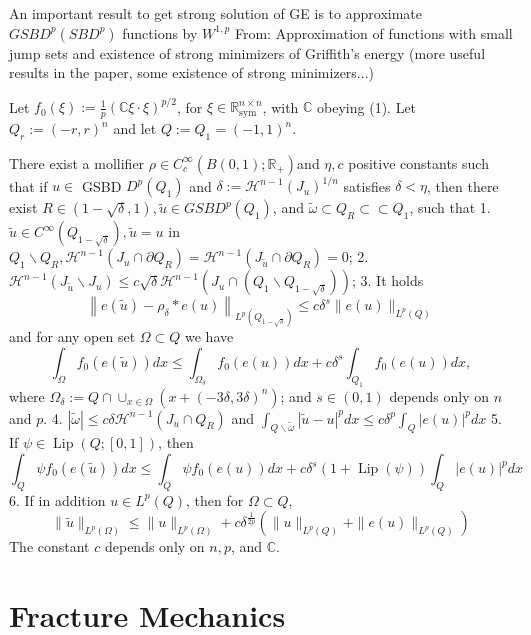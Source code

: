 An important result to get strong solution of GE is to approximate $GSBD^p(SBD^p)$ functions by  $W^{1,p}$
From: Approximation of functions with small jump sets and existence of
strong minimizers of Griffith’s energy (more useful results in the paper, some existence of strong minimizers...)

Let $f_0(\xi):=\frac{1}{p}(\mathbb{C} \xi \cdot \xi)^{p / 2}$, for $\xi \in \mathbb{R}_{\mathrm{sym}}^{n \times n}$, with $\mathbb{C}$ obeying (1). Let $Q_r:=(-r, r)^n$ and let $Q:=Q_1=(-1,1)^n$.
\begin{theorem}
There exist a mollifier $\rho \in C_c^{\infty}\left(B(0,1) ; \mathbb{R}_{+}\right)$and $\eta, c$ positive constants such that if $u \in$ GSBD $D^p\left(Q_1\right)$ and $\delta:=\mathcal{H}^{n-1}\left(J_u\right)^{1 / n}$ satisfies $\delta<\eta$, then there exist $R \in(1-\sqrt{\delta}, 1), \tilde{u} \in G S B D^p\left(Q_1\right)$, and $\tilde{\omega} \subset Q_R \subset \subset Q_1$, such that
1. $\tilde{u} \in C^{\infty}\left(Q_{1-\sqrt{\delta}}\right), \tilde{u}=u$ in $Q_1 \backslash Q_R, \mathcal{H}^{n-1}\left(J_u \cap \partial Q_R\right)=\mathcal{H}^{n-1}\left(J_{\tilde{u}} \cap \partial Q_R\right)=0$;
2. $\mathcal{H}^{n-1}\left(J_{\tilde{u}} \backslash J_u\right) \leq c \sqrt{\delta} \mathcal{H}^{n-1}\left(J_u \cap\left(Q_1 \backslash Q_{1-\sqrt{\delta}}\right)\right)$;
3. It holds
$$
\left\|e(\tilde{u})-\rho_\delta * e(u)\right\|_{L^p\left(Q_{1-\sqrt{\delta}}\right)} \leq c \delta^s\|e(u)\|_{L^p(Q)}
$$
and for any open set $\Omega \subset Q$ we have
$$
\int_{\Omega} f_0(e(\tilde{u})) d x \leq \int_{\Omega_\delta} f_0(e(u)) d x+c \delta^s \int_{Q_1} f_0(e(u)) d x,
$$
where $\Omega_\delta:=Q \cap \cup_{x \in \Omega}\left(x+(-3 \delta, 3 \delta)^n\right)$; and $s \in(0,1)$ depends only on $n$ and $p$.
4. $|\tilde{\omega}| \leq c \delta \mathcal{H}^{n-1}\left(J_u \cap Q_R\right)$ and $\int_{Q \backslash \tilde{\omega}}|\tilde{u}-u|^p d x \leq c \delta^p \int_Q|e(u)|^p d x$
5. If $\psi \in \operatorname{Lip}(Q ;[0,1])$, then
$$
\int_Q \psi f_0(e(\tilde{u})) d x \leq \int_Q \psi f_0(e(u)) d x+c \delta^s(1+\operatorname{Lip}(\psi)) \int_Q|e(u)|^p d x
$$
6. If in addition $u \in L^p(Q)$, then for $\Omega \subset Q$,
$$
\|\tilde{u}\|_{L^p(\Omega)} \leq\|u\|_{L^p(\Omega)}+c \delta^{\frac{1}{2 p}}\left(\|u\|_{L^p(Q)}+\|e(u)\|_{L^p(Q)}\right)
$$
The constant $c$ depends only on $n, p$, and $\mathbb{C}$.
\end{theorem}

\section{Fracture Mechanics}

